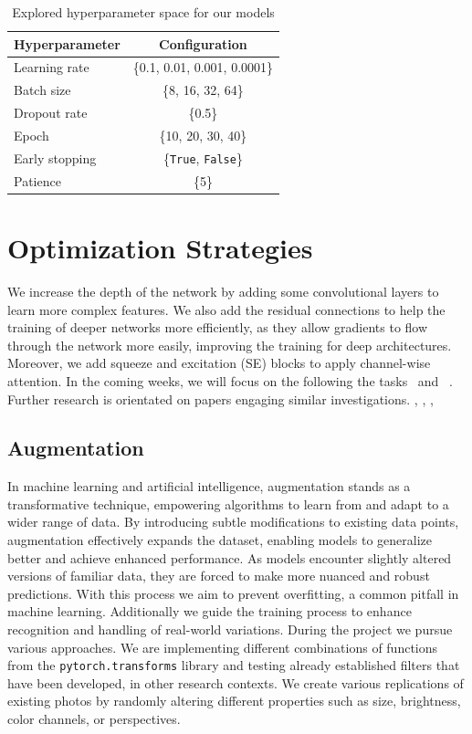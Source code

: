 \begin{table}
    \centering
    \begin{tabular}{@{}lc@{}}
      \toprule
      Hyperparameter & Configuration \\
      \midrule
      Learning rate & \{0.1, 0.01, 0.001, 0.0001\}  \\
      Batch size & \{8, 16, 32, 64\} \\
      Dropout rate & \{0.5\} \\
      Epoch & \{10, 20, 30, 40\} \\
      Early stopping & \{\texttt{True}, \texttt{False}\} \\
      Patience & \{5\} \\
      \bottomrule
    \end{tabular}
    \caption{Explored hyperparameter space for our models}
    \label{tab:hyper}
\end{table}

\section{Optimization Strategies}
\label{sec:optim}
We increase the depth of the network by adding some convolutional layers to learn more complex features. 
We also add the residual connections to help the training of deeper networks more efficiently, 
as they allow gradients to flow through the network more easily, improving the training for deep architectures. 
Moreover, 
we add squeeze and excitation (SE) blocks to apply channel-wise attention. 
In the coming weeks, 
we will focus on the following the tasks~ and ~.
Further research is orientated on papers engaging similar investigations.
\cite{noauthor_multimodal-emotion-recognition00-presentationreportsp4pdf_nodate}, \cite{zeiler_visualizing_2013}, \cite{verma_efficient_2023}, \cite{li_reliable_2017}

\subsection{Augmentation}
\label{sec:optim:aug}
In machine learning and artificial intelligence, 
augmentation stands as a transformative technique, 
empowering algorithms to learn from and adapt to a wider range of data. 
By introducing subtle modifications to existing data points, 
augmentation effectively expands the dataset, 
enabling models to generalize better and achieve enhanced performance.
As models encounter slightly altered versions of familiar data, 
they are forced to make more nuanced and robust predictions. 
With this process we aim to prevent overfitting, 
a common pitfall in machine learning. 
Additionally we guide the training process to enhance recognition and handling of real-world variations.
During the project we pursue various approaches. 
We are implementing different combinations of functions from the \texttt{pytorch.transforms} library and testing already established filters that have been developed, in other research contexts. 
We create various replications of existing photos by randomly altering different properties such as size, brightness, color channels, or perspectives.

